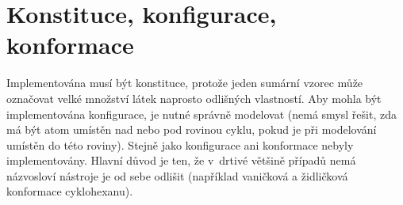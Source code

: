 \section{Konstituce, konfigurace, konformace}
Implementována musí být konstituce, protože jeden sumární vzorec může označovat
velké množství látek naprosto odlišných vlastností. Aby mohla být implementována
konfigurace, je nutné správně modelovat (nemá smysl řešit, zda má být atom
umístěn nad nebo pod rovinou cyklu, pokud je při modelování umístěn do této
roviny). Stejně jako konfigurace ani konformace nebyly implementovány. Hlavní
důvod je ten, že v~drtivé většině případů nemá názvosloví nástroje je od sebe
odlišit (například vaničková a židličková konformace cyklohexanu).

